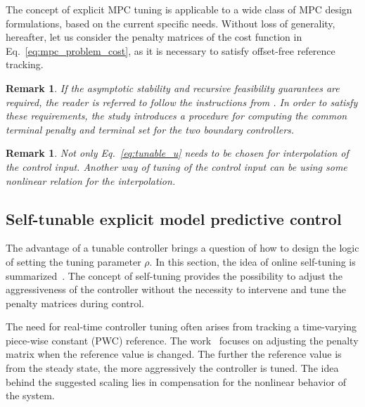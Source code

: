 \documentclass[preprint,12pt]{elsarticle}
\newtheorem{remark}[theorem]{Remark}
\begin{document}
	The concept of explicit MPC tuning is applicable to a wide class of MPC design formulations, based on the current specific needs. Without loss of generality, hereafter, let us consider the penalty matrices of the cost function in Eq.~\eqref{eq:mpc_problem_cost}, as it is necessary to satisfy offset-free reference tracking.
	
	\begin{remark}
		If the asymptotic stability and recursive feasibility guarantees are required, the reader is referred to follow the instructions from \cite{Oravec_tunable}. In order to satisfy these requirements, the study introduces a procedure for computing the common terminal penalty and terminal set for the two boundary controllers. 
	\end{remark}
	
	\begin{remark}
		Not only Eq.~\eqref{eq:tunable_u} needs to be chosen for interpolation of the control input. Another way of tuning of the control input can be using some nonlinear relation for the interpolation. 
	\end{remark}
	
	
	
	\subsection{Self-tunable explicit model predictive control}
	\label{sec:self_tunable}	
	The advantage of a tunable controller brings a question of how to design the logic of setting the tuning parameter $\rho$. In this section, the idea of online self-tuning is summarized~\cite{self_tunable}. The concept of self-tuning provides the possibility to adjust the aggressiveness of the controller without the necessity to intervene and tune the penalty matrices during control. 
	
	The need for real-time controller tuning often arises from tracking a time-varying piece-wise constant (PWC) reference. The work~\cite{self_tunable} focuses on adjusting the penalty matrix when the reference value is changed. The further the reference value is from the steady state, the more aggressively the controller is tuned. The idea behind the suggested scaling lies in compensation for the nonlinear behavior of the system.  
	
\end{document}
